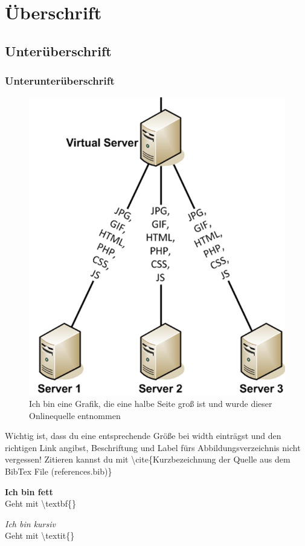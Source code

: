 
\section{Überschrift}
\label{sec:Überschrift}

\subsection{Unterüberschrift}
\label{sec:Unterüberschrift}

\subsubsection{Unterunterüberschrift}
\label{sec:Unterunterüberschrift}

\begin{figure}[!h]
	\begin{center}
		\includegraphics[width=0.5\linewidth]{images/Grafik.png}
		\caption{Ich bin eine Grafik, die eine halbe Seite groß ist und wurde dieser Onlinequelle entnommen \cite{LoadBalancing}}
		\label{Grafik}
	\end{center}
\end{figure}

Wichtig ist, dass du eine entsprechende Größe bei width einträgst und den richtigen Link angibst, Beschriftung und Label fürs Abbildungsverzeichnis nicht vergessen! Zitieren kannst du mit \textbackslash cite\{Kurzbezeichnung der Quelle aus dem BibTex File (references.bib)\}

\textbf{Ich bin fett} \\
Geht mit \textbackslash textbf\{\}

\textit{Ich bin kursiv} \\
Geht mit \textbackslash textit\{\}

